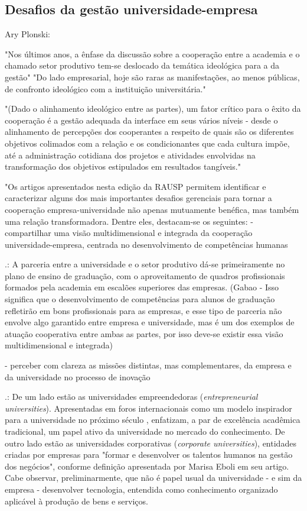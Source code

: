 \subsection{Desafios da gestão universidade-empresa}
\label{cha:univ_empreend}

Ary Plonski:

"Nos últimos anos, a ênfase da discussão sobre a cooperação entre a academia e o chamado setor produtivo tem-se deslocado da temática ideológica para a da gestão"
"Do lado empresarial, hoje são raras as manifestações, ao menos públicas, de confronto ideológico com a instituição universitária."

"(Dado o alinhamento ideológico entre as partes), um fator crítico para o êxito da cooperação é a gestão adequada da interface em seus vários níveis - desde o alinhamento de percepções dos cooperantes a respeito de quais são os diferentes objetivos colimados com a relação e os condicionantes que cada cultura impõe, até a administração cotidiana dos projetos e atividades envolvidas na transformação dos objetivos estipulados em resultados tangíveis."

"Os artigos apresentados nesta edição da RAUSP permitem identificar e caracterizar alguns dos mais importantes desafios gerenciais para tornar a cooperação empresa-universidade não apenas mutuamente benéfica, mas também uma relação transformadora. Dentre eles, destacam-se os seguintes: 
- compartilhar uma visão multidimensional e integrada da cooperação universidade-empresa, centrada no desenvolvimento de competências humanas

.: A parceria entre a universidade e o setor produtivo dá-se primeiramente no plano de ensino de graduação, com o aproveitamento de quadros profissionais formados pela academia em escalões superiores das empresas. (Gabao - Isso significa que o desenvolvimento de competências para alunos de graduação refletirão em bons profissionais para as empresas, e esse tipo de parceria não envolve algo garantido entre empresa e universidade, mas é um dos exemplos de atuação cooperativa entre ambas as partes, por isso deve-se existir essa visão multidimensional e integrada)

- perceber com clareza as missões distintas, mas complementares, da empresa e da universidade no processo de inovação

.: De um lado estão as universidades empreendedoras (\textit{entrepreneurial universities}). Apresentadas em foros internacionais como um modelo inspirador para a universidade no próximo século	, enfatizam, a par de excelência acadêmica tradicional, um papel ativo da universidade no mercado do conhecimento. De outro lado estão as universidades corporativas (\textit{corporate universities}), entidades criadas por empresas para "formar e desenvolver os talentos humanos na gestão dos negócios", conforme definição apresentada por Marisa Eboli em seu artigo.  Cabe observar, preliminarmente, que não é papel usual da universidade - e sim da empresa - desenvolver tecnologia, entendida como conhecimento organizado aplicável à produção de bens e serviços.

